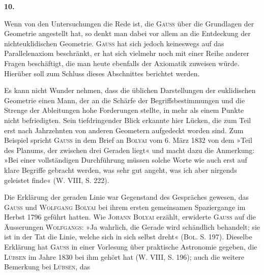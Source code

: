 \clearpage\begingroup{}
\renewcommand{\thefootnote}{\arabic{footnote})}\setcounter{footnote}{0}
\begin{center}
\par\medskip
\textbf{10.}\par\smallskip
{}
\end{center}
\noindent\hspace*{\parindent}Wenn von den Untersuchungen die Rede ist, die \textsc{Gauss} über die Grundlagen
der Geometrie angestellt hat, so denkt man dabei vor allem an die
Entdeckung der nichteuklidischen Geometrie. \textsc{Gauss} hat sich jedoch keineswegs
auf das Parallelenaxiom beschränkt, er hat sich vielmehr noch mit einer
Reihe anderer Fragen beschäftigt, die man heute ebenfalls der Axiomatik zuweisen
würde. Hierüber soll zum Schluss dieses Abschnittes berichtet werden.
\par
Es kann nicht Wunder nehmen, dass die üblichen Darstellungen der
euklidischen Geometrie einen Mann, der an die Schärfe der Begriffsbestimmungen
und die Strenge der Ableitungen hohe Forderungen stellte, in mehr als einem
Punkte nicht befriedigten. Sein tiefdringender Blick erkannte hier Lücken,
die zum Teil erst nach Jahrzehnten von anderen Geometern aufgedeckt worden
sind. Zum Beispiel spricht \textsc{Gauss} in dem Brief an \textsc{Bolyai} vom 6. März 1832
von dem »Teil des Planums, der zwischen drei Geraden liegt« und macht dazu
die Anmerkung: »Bei einer vollständigen Durchführung müssen solche Worte
\clearpage{}\setcounter{footnote}{0}
\noindent wie  auch erst auf klare Begriffe gebracht werden, was sehr gut
angeht, was ich aber nirgends geleistet finde« (W. VIII, S. 222).
\par
Die Erklärung der geraden Linie war Gegenstand des Gespräches gewesen,
das \textsc{Gauss} und \textsc{Wolfgang Bolyai} bei ihrem ersten gemeinsamen
Spaziergange im Herbst 1796 geführt hatten. Wie \textsc{Johann Bolyai} erzählt,
erwiderte \textsc{Gauss} auf die Äusserungen \textsc{Wolfgangs}: »Ja wahrlich, die Gerade
wird schändlich behandelt; sie ist in der Tat die Linie, welche sich in sich
selbst dreht« (\textsc{Bol.} S. 197). Dieselbe Erklärung hat \textsc{Gauss} in einer Vorlesung
über praktische Astronomie gegeben, die \textsc{Lübsen} im Jahre 1830 bei ihm gehört
hat (W. VIII, S. 196); auch die weitere Bemerkung bei \textsc{Lübsen}, das
